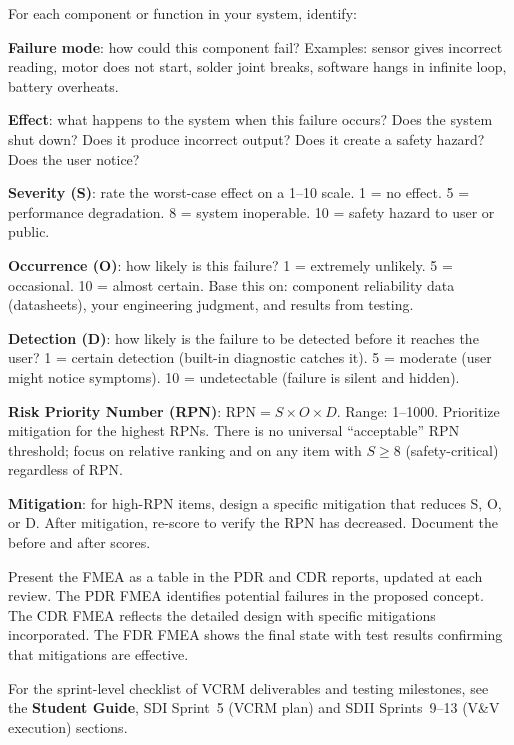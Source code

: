 For each component or function in your system, identify:

\textbf{Failure mode}: how could this component fail? Examples: sensor gives incorrect reading, motor does not start, solder joint breaks, software hangs in infinite loop, battery overheats.

\textbf{Effect}: what happens to the system when this failure occurs? Does the system shut down? Does it produce incorrect output? Does it create a safety hazard? Does the user notice?

\textbf{Severity (S)}: rate the worst-case effect on a 1--10 scale. 1 = no effect. 5 = performance degradation. 8 = system inoperable. 10 = safety hazard to user or public.

\textbf{Occurrence (O)}: how likely is this failure? 1 = extremely unlikely. 5 = occasional. 10 = almost certain. Base this on: component reliability data (datasheets), your engineering judgment, and results from testing.

\textbf{Detection (D)}: how likely is the failure to be detected before it reaches the user? 1 = certain detection (built-in diagnostic catches it). 5 = moderate (user might notice symptoms). 10 = undetectable (failure is silent and hidden).

\textbf{Risk Priority Number (RPN)}: $\text{RPN} = S \times O \times D$. Range: 1--1000. Prioritize mitigation for the highest RPNs. There is no universal ``acceptable'' RPN threshold; focus on relative ranking and on any item with $S \geq 8$ (safety-critical) regardless of RPN.

\textbf{Mitigation}: for high-RPN items, design a specific mitigation that reduces S, O, or D. After mitigation, re-score to verify the RPN has decreased. Document the before and after scores.

\begin{tipbox}
Present the FMEA as a table in the PDR and CDR reports, updated at each review. The PDR FMEA identifies potential failures in the proposed concept. The CDR FMEA reflects the detailed design with specific mitigations incorporated. The FDR FMEA shows the final state with test results confirming that mitigations are effective.
\end{tipbox}



\begin{tipbox}
For the sprint-level checklist of VCRM deliverables and testing milestones, see the \textbf{Student Guide}, SDI Sprint~5 (VCRM plan) and SDII Sprints~9--13 (V\&V execution) sections.
\end{tipbox}

